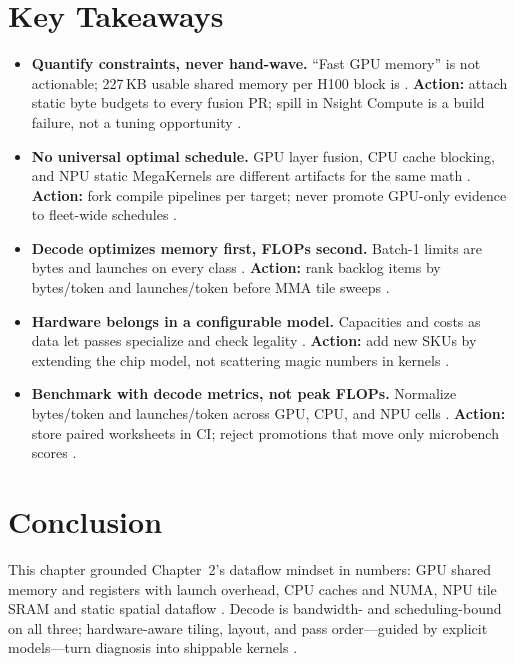 \section{Key Takeaways}
\label{sec:ch03_key_takeaways}

\begin{itemize}
\item \textbf{Quantify constraints, never hand-wave.}
``Fast GPU memory'' is not actionable; 227\,KB usable shared memory per H100 block is \citep{nvidia2022hopper}.
\textbf{Action:} attach static byte budgets to every fusion PR; spill in Nsight Compute is a build failure, not a tuning opportunity \citep{memoryfloor2026}.

\item \textbf{No universal optimal schedule.}
GPU layer fusion, CPU cache blocking, and NPU static MegaKernels are different artifacts for the same math \citep{amd2024xdna,rotem2018glow,mpk2025}.
\textbf{Action:} fork compile pipelines per target; never promote GPU-only evidence to fleet-wide schedules \citep{patel2025llminference,yirage2026}.

\item \textbf{Decode optimizes memory first, FLOPs second.}
Batch-1 limits are bytes and launches on every class \citep{taxbreak2026,kwon2023vllm,memoryfloor2026}.
\textbf{Action:} rank backlog items by bytes/token and launches/token before MMA tile sweeps \citep{patel2025llminference}.

\item \textbf{Hardware belongs in a configurable model.}
Capacities and costs as data let passes specialize and check legality \citep{yirage2026,wu2024mirage}.
\textbf{Action:} add new SKUs by extending the chip model, not scattering magic numbers in kernels \citep{iree2024}.

\item \textbf{Benchmark with decode metrics, not peak FLOPs.}
Normalize bytes/token and launches/token across GPU, CPU, and NPU cells \citep{taxbreak2026,memoryfloor2026}.
\textbf{Action:} store paired worksheets in CI; reject promotions that move only microbench scores \citep{patel2025llminference}.
\end{itemize}

\section{Conclusion}
\label{sec:ch03_conclusion}

This chapter grounded Chapter~2's dataflow mindset in numbers: GPU shared memory and registers with launch overhead, CPU caches and NUMA, NPU tile SRAM and static spatial dataflow \citep{nvidia2022hopper,dlbook,amd2024xdna,amd2024aie}.
Decode is bandwidth- and scheduling-bound on all three; hardware-aware tiling, layout, and pass order---guided by explicit models---turn diagnosis into shippable kernels \citep{chen2020compilerbasedhardw,yirage2026,taxbreak2026,memoryfloor2026}.

